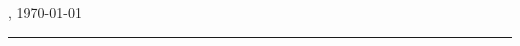 \thispagestyle{empty}

\section*{\langstatementofauthorship}

\langstatementofauthorshiptext

\vfill

\mysubmissionLocation, \today
\vspace{4em}

\rule{6cm}{0.4pt}\\
\myauthor
